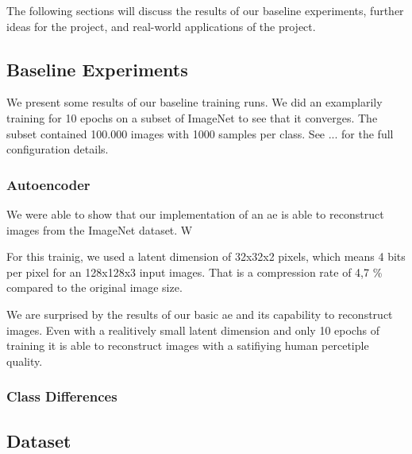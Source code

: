 The following sections will discuss the results of our baseline experiments, further ideas for the project, and real-world applications of the project.

\subsection{Baseline Experiments}\label{subsec:baseline-results}
    We present some results of our baseline training runs. We did an examplarily training for 10 epochs on a subset of ImageNet to see that it converges. The subset contained 100.000 images with 1000 samples per class. See ... for the full configuration details.

    \subsubsection{Autoencoder}\label{subsubsec:autoencoder}
        We were able to show that our implementation of an \ac{ae} is able to reconstruct images from the ImageNet dataset. W

        For this trainig, we used a latent dimension of 32x32x2 pixels, which means 4 bits per pixel for an 128x128x3 input images. That is a compression rate of 4,7 \% compared to the original image size.

        We are surprised by the results of our basic \ac{ae} and its capability to reconstruct images. Even with a realitively small latent dimension and only 10 epochs of training it is able to reconstruct images with a satifiying human percetiple quality.
        

\subsubsection{Class Differences}\label{subsubsec:class-differences}

\subsection{Dataset}\label{subsec:dataset}

